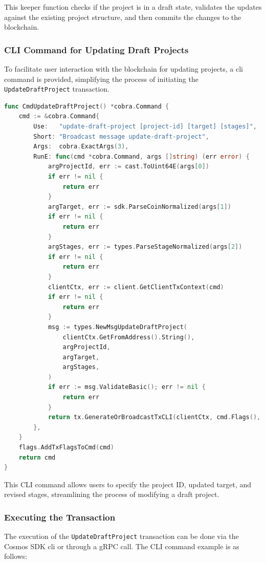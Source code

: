 This keeper function checks if the project is in a draft state, validates the updates against the existing project structure, and then commits the changes to the blockchain.

\subsubsection{CLI Command for Updating Draft Projects}
\label{subsubsec:cli-update-draft}

To facilitate user interaction with the blockchain for updating projects, a \gls{cli} command is provided, simplifying the process of initiating the \texttt{UpdateDraftProject} transaction.

\newpage
\begin{lstlisting}[language=go, caption=Create Project CLI definition, label={lst:update-draft-cli}]
func CmdUpdateDraftProject() *cobra.Command {
	cmd := &cobra.Command{
		Use:   "update-draft-project [project-id] [target] [stages]",
		Short: "Broadcast message update-draft-project",
		Args:  cobra.ExactArgs(3),
		RunE: func(cmd *cobra.Command, args []string) (err error) {
			argProjectId, err := cast.ToUint64E(args[0])
			if err != nil {
				return err
			}
			argTarget, err := sdk.ParseCoinNormalized(args[1])
			if err != nil {
				return err
			}
			argStages, err := types.ParseStageNormalized(args[2])
			if err != nil {
				return err
			}
			clientCtx, err := client.GetClientTxContext(cmd)
			if err != nil {
				return err
			}
			msg := types.NewMsgUpdateDraftProject(
				clientCtx.GetFromAddress().String(),
				argProjectId,
				argTarget,
				argStages,
			)
			if err := msg.ValidateBasic(); err != nil {
				return err
			}
			return tx.GenerateOrBroadcastTxCLI(clientCtx, cmd.Flags(), msg)
		},
	}
	flags.AddTxFlagsToCmd(cmd)
	return cmd
}
\end{lstlisting}

This CLI command allows users to specify the project ID, updated target, and revised stages, streamlining the process of modifying a draft project.

\subsubsection{Executing the Transaction}
\label{subsubsec:executing-update-draft}

The execution of the \texttt{UpdateDraftProject} transaction can be done via the Cosmos SDK \gls{cli} or through a gRPC call. The CLI command example is as follows:

